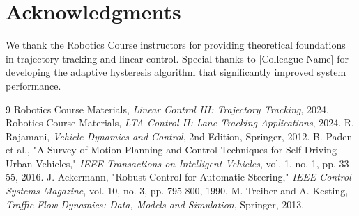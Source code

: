 \documentclass[12pt]{article}
\begin{document}
\section*{Acknowledgments}
We thank the Robotics Course instructors for providing theoretical foundations in trajectory tracking and linear control. Special thanks to [Colleague Name] for developing the adaptive hysteresis algorithm that significantly improved system performance.
\begin{thebibliography}{9}
Robotics Course Materials, \textit{Linear Control III: Trajectory Tracking}, 2024.
Robotics Course Materials, \textit{LTA Control II: Lane Tracking Applications}, 2024.
R. Rajamani, \textit{Vehicle Dynamics and Control}, 2nd Edition, Springer, 2012.
B. Paden et al., "A Survey of Motion Planning and Control Techniques for Self-Driving Urban Vehicles," \textit{IEEE Transactions on Intelligent Vehicles}, vol. 1, no. 1, pp. 33-55, 2016.
J. Ackermann, "Robust Control for Automatic Steering," \textit{IEEE Control Systems Magazine}, vol. 10, no. 3, pp. 795-800, 1990.
M. Treiber and A. Kesting, \textit{Traffic Flow Dynamics: Data, Models and Simulation}, Springer, 2013.
\end{thebibliography}
\end{document}
